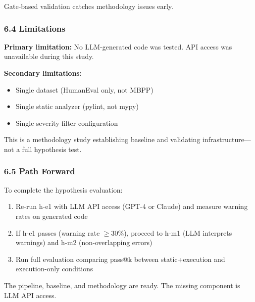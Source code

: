 Gate-based validation catches methodology issues early.

\subsubsection{6.4 Limitations}

\textbf{Primary limitation:} No LLM-generated code was tested. API access was unavailable during this study.

\textbf{Secondary limitations:}
\begin{itemize}
\item Single dataset (HumanEval only, not MBPP)
\item Single static analyzer (pylint, not mypy)
\item Single severity filter configuration
\end{itemize}

This is a methodology study establishing baseline and validating infrastructure---not a full hypothesis test.

\subsubsection{6.5 Path Forward}

To complete the hypothesis evaluation:

\begin{enumerate}
\item Re-run h-e1 with LLM API access (GPT-4 or Claude) and measure warning rates on generated code
\item If h-e1 passes (warning rate $\geq 30$\%), proceed to h-m1 (LLM interprets warnings) and h-m2 (non-overlapping errors)
\item Run full evaluation comparing pass@k between static+execution and execution-only conditions
\end{enumerate}

The pipeline, baseline, and methodology are ready. The missing component is LLM API access.
